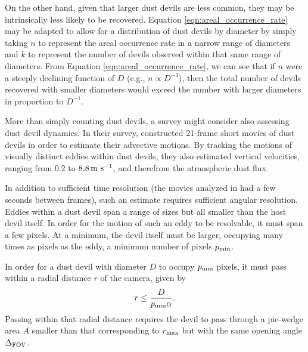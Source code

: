 \documentclass{aastex63}
\begin{document}
On the other hand, given that larger dust devils are less common, they may be intrinsically less likely to be recovered. Equation \ref{eqn:areal_occurrence_rate} may be adapted to allow for a distribution of dust devils by diameter by simply taking $n$ to represent the areal occurrence rate in a narrow range of diameters and $k$ to represent the number of devils observed within that same range of diameters. From Equation \ref{eqn:areal_occurrence_rate}, we can see that if $n$ were a steeply declining function of $D$ (e.g., $n \propto D^{-3}$), then the total number of devils recovered with smaller diameters would exceed the number with larger diameters in proportion to $D^{-1}$.

More than simply counting dust devils, a survey might consider also assessing dust devil dynamics. In their survey, \citet{2006JGRE..11112S09G} constructed 21-frame short movies of dust devils in order to estimate their advective motions. By tracking the motions of visually distinct eddies within dust devils, they also estimated vertical velocities, ranging from $0.2$ to $8.8\,{\rm m\ s^{-1}}$, and therefrom the atmospheric dust flux. 

In addition to sufficient time resolution (the movies analyzed in \citealt{2006JGRE..11112S09G} had a few seconds between frames), such an estimate requires sufficient angular resolution. Eddies within a dust devil span a range of sizes but all smaller than the host devil itself. In order for the motion of such an eddy to be resolvable, it must span a few pixels. At a minimum, the devil itself must be larger, occupying many times as pixels as the eddy, a minimum number of pixels $p_{\rm min}$.

In order for a dust devil with diameter $D$ to occupy $p_{\rm min}$ pixels, it must pass within a radial distance $r$ of the camera, given by 
\begin{equation}
    r \le \frac{D}{p_{\rm min} \alpha}.
    \label{eqn:encounter_distance}
\end{equation}
Passing within that radial distance requires the devil to pass through a pie-wedge area $A$ smaller than that corresponding to $r_{\rm max}$ but with the same opening angle $\Delta_{\rm FOV}$.
\end{document}
